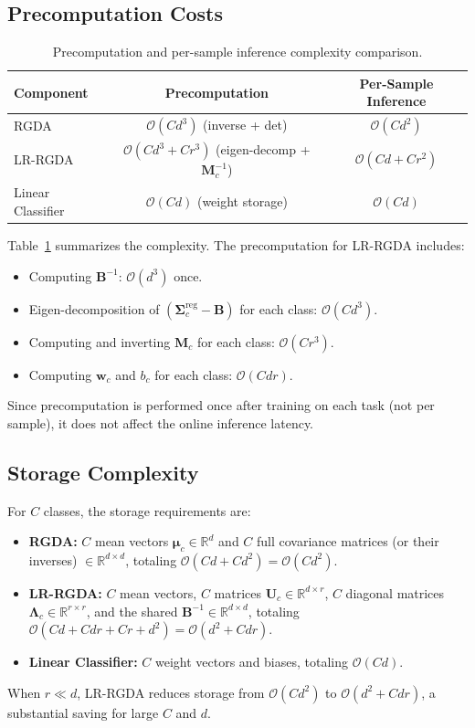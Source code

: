 \documentclass{article}
\begin{document}
\subsection{Precomputation Costs}

\begin{table}[h]
\centering
\caption{Precomputation and per-sample inference complexity comparison.}
\label{tab:complexity}
\begin{tabular}{lcc}
\toprule
\textbf{Component} & \textbf{Precomputation} & \textbf{Per-Sample Inference} \\
\midrule
RGDA & $\mathcal{O}(Cd^3)$ (inverse + det) & $\mathcal{O}(Cd^2)$ \\
LR-RGDA & $\mathcal{O}(Cd^3 + Cr^3)$ (eigen-decomp + $\mathbf{M}_c^{-1}$) & $\mathcal{O}(Cd + Cr^2)$ \\
Linear Classifier & $\mathcal{O}(Cd)$ (weight storage) & $\mathcal{O}(Cd)$ \\
\bottomrule
\end{tabular}
\end{table}

Table~\ref{tab:complexity} summarizes the complexity. The precomputation for LR-RGDA includes:
\begin{itemize}
    \item Computing $\mathbf{B}^{-1}$: $\mathcal{O}(d^3)$ once.
    \item Eigen-decomposition of $(\mathbf{\Sigma}_c^{\text{reg}} - \mathbf{B})$ for each class: $\mathcal{O}(Cd^3)$.
    \item Computing and inverting $\mathbf{M}_c$ for each class: $\mathcal{O}(Cr^3)$.
    \item Computing $\mathbf{w}_c$ and $b_c$ for each class: $\mathcal{O}(Cdr)$.
\end{itemize}
Since precomputation is performed once after training on each task (not per sample), it does not affect the online inference latency.

\subsection{Storage Complexity}

For $C$ classes, the storage requirements are:
\begin{itemize}
    \item \textbf{RGDA:} $C$ mean vectors $\boldsymbol{\mu}_c \in \mathbb{R}^d$ and $C$ full covariance matrices (or their inverses) $\in \mathbb{R}^{d \times d}$, totaling $\mathcal{O}(Cd + Cd^2) = \mathcal{O}(Cd^2)$.
    \item \textbf{LR-RGDA:} $C$ mean vectors, $C$ matrices $\mathbf{U}_c \in \mathbb{R}^{d \times r}$, $C$ diagonal matrices $\boldsymbol{\Lambda}_c \in \mathbb{R}^{r \times r}$, and the shared $\mathbf{B}^{-1} \in \mathbb{R}^{d \times d}$, totaling $\mathcal{O}(Cd + Cdr + Cr + d^2) = \mathcal{O}(d^2 + Cdr)$.
    \item \textbf{Linear Classifier:} $C$ weight vectors and biases, totaling $\mathcal{O}(Cd)$.
\end{itemize}
When $r \ll d$, LR-RGDA reduces storage from $\mathcal{O}(Cd^2)$ to $\mathcal{O}(d^2 + Cdr)$, a substantial saving for large $C$ and $d$.
\end{document}
